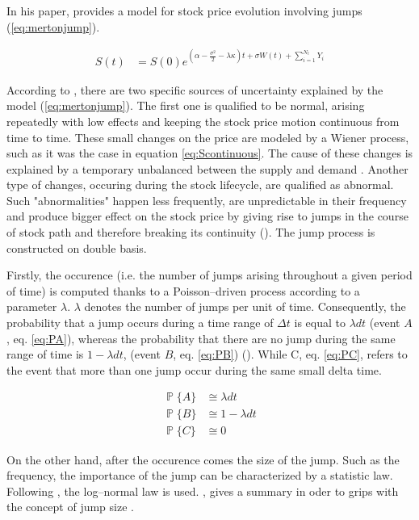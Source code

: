 \documentclass[12pt]{report}
\newcommand{\Bm}{W\left(t\right)}
\newcommand{\St}{S\left(t\right)}
\begin{document}
In his paper, \citet{merton76} provides a model for stock price evolution involving jumps (\cref{eq:mertonjump}). 


\begin{align}
  \St &= S\left(0\right) e^{\left(\alpha - \frac{\sigma^2}{2} - \lambda \kappa\right) t + \sigma \Bm + \sum_{i=1}^{N_t} Y_i}
  \label{eq:mertonjump}
\end{align}
  
According to \citet{merton76}, there are two specific sources of uncertainty explained by the model (\cref{eq:mertonjump}). 
The first one is qualified to be normal, arising repeatedly with low effects and keeping the stock price motion continuous from time to time. These small changes on the price are modeled by a Wiener process, such as it was the case in equation \ref{eq:Scontinuous}. The cause of these changes is explained by a temporary unbalanced between the supply and demand \citet{merton76}.
Another type of changes, occuring during the stock lifecycle, are qualified as abnormal. Such "abnormalities" happen less frequently, are unpredictable in their frequency and produce bigger effect on the stock price by giving rise to jumps in the course of stock path and therefore breaking its continuity (\citet{merton76}). The jump process is constructed on double basis. 

Firstly, the occurence (i.e. the number of jumps arising throughout a given period of time) is computed thanks to a Poisson--driven process according to a parameter $\lambda$. 
$\lambda$ denotes the number of jumps per unit of time. Consequently, the probability that a jump occurs during a time range of $\Delta t$ is equal to $\lambda dt$ (event $A$, eq. \ref{eq:PA}), whereas the probability that there are no jump during the same range of time is $1 - \lambda dt$, (event $B$, eq. \ref{eq:PB}) (\citet{matsuda2004}). While C, eq. \ref{eq:PC}, refers to the event that more than one jump occur during the same small delta time.

\begin{align}
  \mathop{\mathbb{P}} \{A\}&\cong \lambda dt  \label{eq:PA}\\
  \mathop{\mathbb{P}} \{B\}&\cong 1 - \lambda dt  \label{eq:PB}\\
  \mathop{\mathbb{P}} \{C\}&\cong   0 \label{eq:PC}
\end{align}

On the other hand, after the occurence comes the size of the jump. Such as the frequency, the importance of the jump can be characterized by a statistic law. Following \citet{heston}, the log--normal law is used. \citet{matsuda2004}, gives a summary in oder to grips with the concept of jump size  .
 
\end{document}
